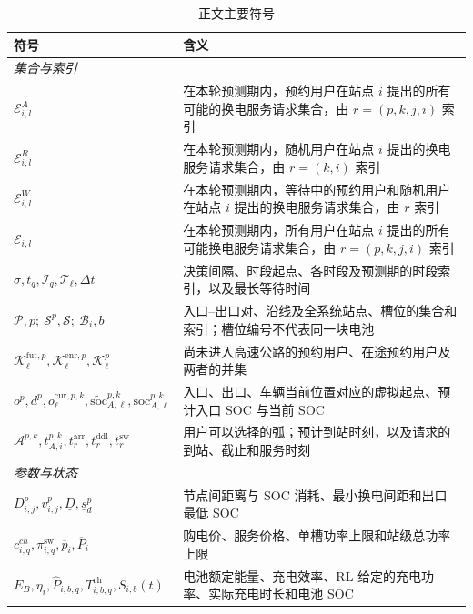 \documentclass[12pt,a4paper,UTF8]{ctexart}
\begin{document}
\begin{table}[!ht]
  \centering
  \caption{正文主要符号}
  \label{tab:notation}
  \small
  \setlength{\tabcolsep}{3pt}
  \renewcommand{\arraystretch}{0.98}
  \begin{tabular}{@{}lp{11cm}@{}}
    \toprule
    \textbf{符号} & \textbf{含义} \\
    \midrule
    \multicolumn{2}{l}{\textit{集合与索引}} \\
    $\mathcal E_{i,l}^A$ & 在本轮预测期内，预约用户在站点 $i$ 提出的所有可能的换电服务请求集合，由 $r=(p,k,j,i)$ 索引 \\
    $\mathcal E_{i,l}^R$ & 在本轮预测期内，随机用户在站点 $i$ 提出的换电服务请求集合，由 $r=(k,i)$ 索引 \\
    $\mathcal E_{i,l}^{W}$ & 在本轮预测期内，等待中的预约用户和随机用户在站点 $i$ 提出的换电服务请求集合，由 $r$ 索引 \\
    $\mathcal E_{i,l}$ & 在本轮预测期内，所有用户在站点 $i$ 提出的所有可能换电服务请求集合，由 $r=(p,k,j,i)$ 索引 \\
    $\sigma,t_q,\mathcal I_q,\mathcal T_\ell,\Delta t$ & 决策间隔、时段起点、各时段及预测期的时段索引，以及最长等待时间 \\
    $\mathcal P,p;\ \mathcal S^p,\mathcal S;\ \mathcal B_i,b$ & 入口--出口对、沿线及全系统站点、槽位的集合和索引；槽位编号不代表同一块电池 \\
    $\mathcal K_\ell^{\mathrm{fut},p},\mathcal K_\ell^{\mathrm{enr},p},\mathcal K_\ell^p$ & 尚未进入高速公路的预约用户、在途预约用户及两者的并集 \\
    $o^p,d^p,o_\ell^{\mathrm{cur},p,k},\widetilde{\mathrm{soc}}_{A,\ell}^{p,k},\mathrm{soc}_{A,\ell}^{p,k}$ & 入口、出口、车辆当前位置对应的虚拟起点、预计入口 SOC 与当前 SOC \\
    $\mathcal A^{p,k},t_{A,i}^{p,k},t_r^{\mathrm{arr}},t_r^{\mathrm{ddl}},t_r^{\mathrm{sw}}$ & 用户可以选择的弧；预计到站时刻，以及请求的到站、截止和服务时刻 \\
    \midrule
    \multicolumn{2}{l}{\textit{参数与状态}} \\
    $D_{i,j}^{p},v_{i,j}^{p},\underline D,\underline s_d^p$ & 节点间距离与 SOC 消耗、最小换电间距和出口最低 SOC \\
    $c^{ch}_{i,q},\pi_{i,q}^{\mathrm{sw}},\overline p_i,\overline P_i$ & 购电价、服务价格、单槽功率上限和站级总功率上限 \\
    $E_B,\eta_i,\widehat P_{i,b,q},T_{i,b,q}^{\mathrm{ch}},S_{i,b}(t)$ & 电池额定能量、充电效率、RL 给定的充电功率、实际充电时长和电池 SOC \\

\end{tabular}
\end{table}
\end{document}
